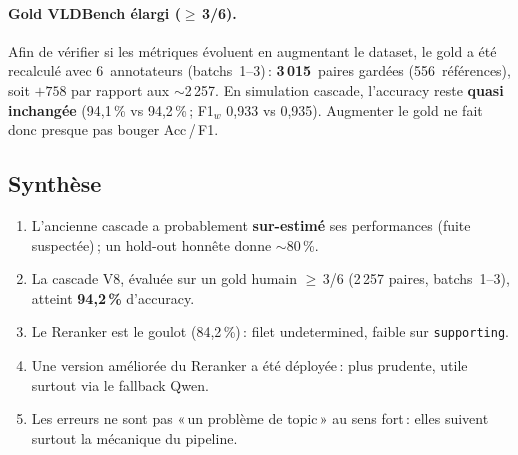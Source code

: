 \paragraph{Gold VLDBench élargi ($\ge$\,3/6).}
Afin de vérifier si les métriques évoluent en augmentant le dataset, le gold a été recalculé avec 6~annotateurs (batchs~1--3)\,: \textbf{3\,015}~paires gardées (556~références), soit $+758$ par rapport aux $\sim$2\,257. En simulation cascade, l'accuracy reste \textbf{quasi inchangée} (94{,}1\,\% vs 94{,}2\,\%\,; F1$_w$ 0{,}933 vs 0{,}935). Augmenter le gold ne fait donc presque pas bouger Acc\,/\,F1.

\subsection*{Synthèse}

\begin{enumerate}
    \item L'ancienne cascade a probablement \textbf{sur-estimé} ses performances (fuite suspectée)\,; un hold-out honnête donne $\sim$80\,\%.
    \item La cascade V8, évaluée sur un gold humain $\ge$\,3/6 (2\,257 paires, batchs~1--3), atteint \textbf{94{,}2\,\%} d'accuracy.
    \item Le Reranker est le goulot (84{,}2\,\%)\,: filet undetermined, faible sur \texttt{supporting}.
    \item Une version améliorée du Reranker a été déployée\,: plus prudente, utile surtout via le fallback Qwen.
    \item Les erreurs ne sont pas «\,un problème de topic\,» au sens fort\,: elles suivent surtout la mécanique du pipeline.
\end{enumerate}
